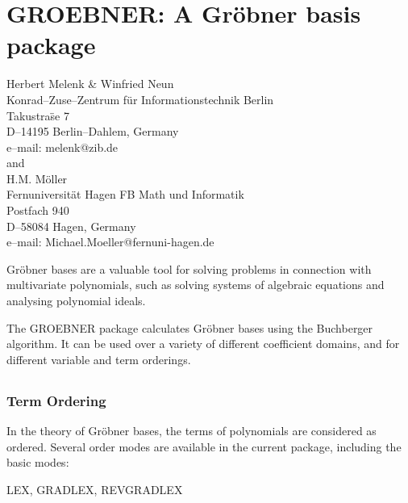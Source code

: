 \chapter{GROEBNER: A Gr\"obner basis package}
\label{GROEBNER}

{\footnotesize
\begin{center}
Herbert Melenk \& Winfried Neun \\
Konrad--Zuse--Zentrum f\"ur Informationstechnik Berlin \\
Takustra\"se 7 \\
D--14195 Berlin--Dahlem, Germany \\[0.05in]
e--mail:  melenk@zib.de \\[0.05in]
and \\[0.05in]
H.M. M\"oller \\
Fernuniversit\"at Hagen FB Math und Informatik\\
Postfach 940 \\
D--58084 Hagen, Germany\\[0.05in]
e--mail: Michael.Moeller@fernuni-hagen.de
\end{center}
}


Gr\"obner bases are a valuable tool for solving problems in
connection with multivariate polynomials, such as solving systems of
algebraic equations and analysing polynomial ideals.

The GROEBNER package calculates Gr\"obner bases using the
Buchberger algorithm.  It can be used over a variety of different
coefficient domains, and for different variable and term orderings.

\section{}
\subsection{Term Ordering} \par
In the theory of Gr\"obner bases, the terms of polynomials are
considered as ordered.  Several order modes are available in
the current package, including the basic modes:

\begin{center}
LEX, GRADLEX, REVGRADLEX
\end{center}

